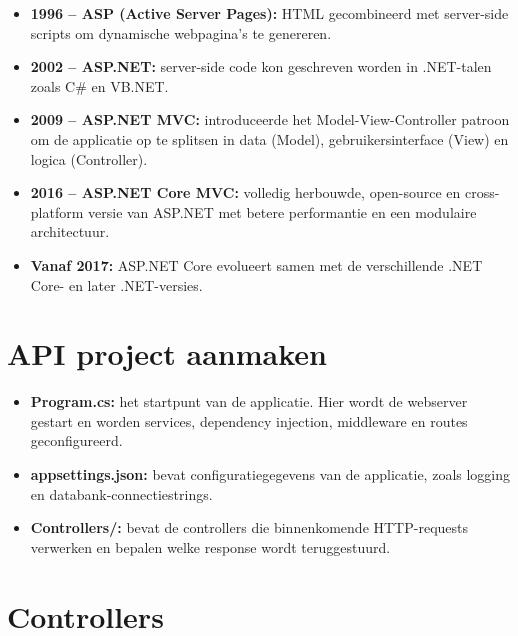 \begin{itemize}
    \item \textbf{1996 -- ASP (Active Server Pages):} HTML gecombineerd met server-side scripts om dynamische webpagina's te genereren.
    
    \item \textbf{2002 -- ASP.NET:} server-side code kon geschreven worden in .NET-talen zoals C\# en VB.NET.
    
    \item \textbf{2009 -- ASP.NET MVC:} introduceerde het Model-View-Controller patroon om de applicatie op te splitsen in data (Model), gebruikersinterface (View) en logica (Controller).
    
    \item \textbf{2016 -- ASP.NET Core MVC:} volledig herbouwde, open-source en cross-platform versie van ASP.NET met betere performantie en een modulaire architectuur.
    
    \item \textbf{Vanaf 2017:} ASP.NET Core evolueert samen met de verschillende .NET Core- en later .NET-versies.
\end{itemize}


\section{API project aanmaken}
\begin{itemize}
    \item \textbf{Program.cs:} het startpunt van de applicatie. Hier wordt de webserver gestart en worden services, dependency injection, middleware en routes geconfigureerd.

    \item \textbf{appsettings.json:} bevat configuratiegegevens van de applicatie, zoals logging en databank-connectiestrings.

    \item \textbf{Controllers/:} bevat de controllers die binnenkomende HTTP-requests verwerken en bepalen welke response wordt teruggestuurd.
\end{itemize}

\section{Controllers}
